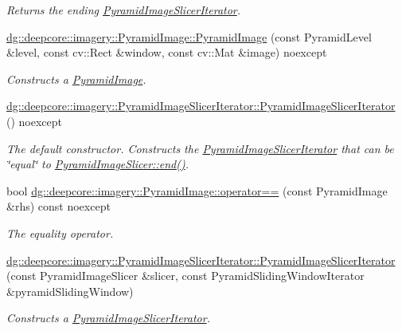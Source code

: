 \begin{DoxyCompactItemize}
\begin{DoxyCompactList}\small\item\em Returns the ending \hyperlink{classdg_1_1deepcore_1_1imagery_1_1_pyramid_image_slicer_iterator}{Pyramid\+Image\+Slicer\+Iterator}. \end{DoxyCompactList}\item 
\hyperlink{group___imagery_module_gaf984c16fb13cf715c6948a5754e49030}{dg\+::deepcore\+::imagery\+::\+Pyramid\+Image\+::\+Pyramid\+Image} (const Pyramid\+Level \&level, const cv\+::\+Rect \&window, const cv\+::\+Mat \&image) noexcept
\begin{DoxyCompactList}\small\item\em Constructs a \hyperlink{structdg_1_1deepcore_1_1imagery_1_1_pyramid_image}{Pyramid\+Image}. \end{DoxyCompactList}\item 
\hyperlink{group___imagery_module_gab8b3f9886530d00229870234b0457e5a}{dg\+::deepcore\+::imagery\+::\+Pyramid\+Image\+Slicer\+Iterator\+::\+Pyramid\+Image\+Slicer\+Iterator} () noexcept
\begin{DoxyCompactList}\small\item\em The default constructor. Constructs the \hyperlink{classdg_1_1deepcore_1_1imagery_1_1_pyramid_image_slicer_iterator}{Pyramid\+Image\+Slicer\+Iterator} that can be \char`\"{}equal\char`\"{} to \hyperlink{group___imagery_module_ga6956abd01339df9e8c60963702ce3543}{Pyramid\+Image\+Slicer\+::end()}. \end{DoxyCompactList}\item 
bool \hyperlink{group___imagery_module_ga584d04224a994c7b1acef73a43fb531a}{dg\+::deepcore\+::imagery\+::\+Pyramid\+Image\+::operator==} (const Pyramid\+Image \&rhs) const noexcept
\begin{DoxyCompactList}\small\item\em The equality operator. \end{DoxyCompactList}\item 
\hyperlink{group___imagery_module_gae2892ba870dde12cc9fe000bd8ef35b4}{dg\+::deepcore\+::imagery\+::\+Pyramid\+Image\+Slicer\+Iterator\+::\+Pyramid\+Image\+Slicer\+Iterator} (const Pyramid\+Image\+Slicer \&slicer, const Pyramid\+Sliding\+Window\+Iterator \&pyramid\+Sliding\+Window)
\begin{DoxyCompactList}\small\item\em Constructs a \hyperlink{classdg_1_1deepcore_1_1imagery_1_1_pyramid_image_slicer_iterator}{Pyramid\+Image\+Slicer\+Iterator}. \end{DoxyCompactList}\item 

\end{DoxyCompactItemize}
